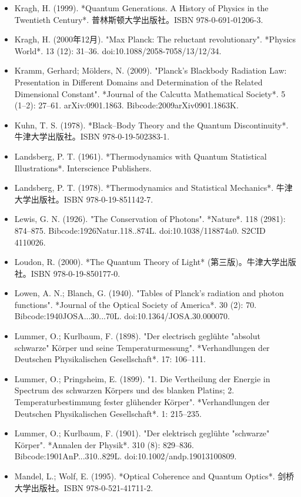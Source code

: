 \begin{itemize}
\item Kragh, H. (1999). *Quantum Generations. A History of Physics in the Twentieth Century*. 普林斯顿大学出版社。ISBN 978-0-691-01206-3.  
\item Kragh, H. (2000年12月). "Max Planck: The reluctant revolutionary". *Physics World*. 13 (12): 31–36. doi:10.1088/2058-7058/13/12/34.  
\item Kramm, Gerhard; Mölders, N. (2009). "Planck's Blackbody Radiation Law: Presentation in Different Domains and Determination of the Related Dimensional Constant". *Journal of the Calcutta Mathematical Society*. 5 (1–2): 27–61. arXiv:0901.1863. Bibcode:2009arXiv0901.1863K.  
\item Kuhn, T. S. (1978). *Black–Body Theory and the Quantum Discontinuity*. 牛津大学出版社。ISBN 978-0-19-502383-1.  
\item Landsberg, P. T. (1961). *Thermodynamics with Quantum Statistical Illustrations*. Interscience Publishers.  
\item Landsberg, P. T. (1978). *Thermodynamics and Statistical Mechanics*. 牛津大学出版社。ISBN 978-0-19-851142-7.  
\item Lewis, G. N. (1926). "The Conservation of Photons". *Nature*. 118 (2981): 874–875. Bibcode:1926Natur.118..874L. doi:10.1038/118874a0. S2CID 4110026.  
\item Loudon, R. (2000). *The Quantum Theory of Light* (第三版)。牛津大学出版社。ISBN 978-0-19-850177-0.  
\item Lowen, A. N.; Blanch, G. (1940). "Tables of Planck's radiation and photon functions". *Journal of the Optical Society of America*. 30 (2): 70. Bibcode:1940JOSA...30...70L. doi:10.1364/JOSA.30.000070.  
\item Lummer, O.; Kurlbaum, F. (1898). "Der electrisch geglühte "absolut schwarze" Körper und seine Temperaturmessung". *Verhandlungen der Deutschen Physikalischen Gesellschaft*. 17: 106–111.  
\item Lummer, O.; Pringsheim, E. (1899). "1. Die Vertheilung der Energie in Spectrum des schwarzen Körpers und des blanken Platins; 2. Temperaturbestimmung fester glühender Körper". *Verhandlungen der Deutschen Physikalischen Gesellschaft*. 1: 215–235.  
\item Lummer, O.; Kurlbaum, F. (1901). "Der elektrisch geglühte "schwarze" Körper". *Annalen der Physik*. 310 (8): 829–836. Bibcode:1901AnP...310..829L. doi:10.1002/andp.19013100809.
\item Mandel, L.; Wolf, E. (1995). *Optical Coherence and Quantum Optics*. 剑桥大学出版社。ISBN 978-0-521-41711-2.  

\end{itemize}
